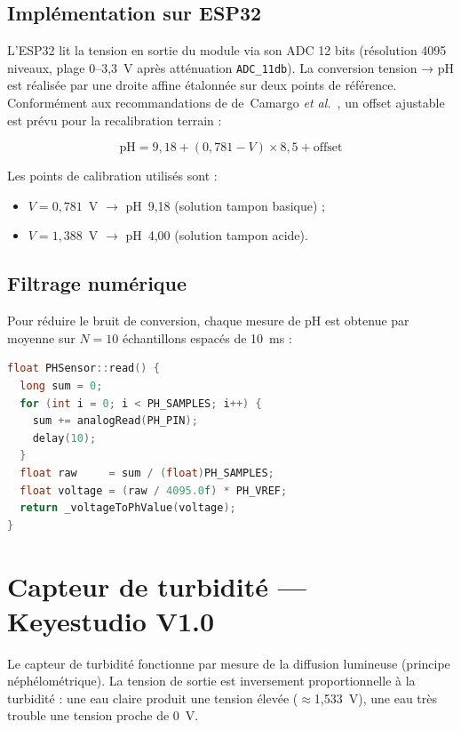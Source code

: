 \documentclass[12pt,a4paper]{report}
\newcommand{\code}[1]{\texttt{\small\colorbox{codebg}{#1}}}
\begin{document}
\subsection{Implémentation sur ESP32}

L'ESP32 lit la tension en sortie du module via son ADC 12 bits (résolution 4095 niveaux,
plage 0--3{,}3~V après atténuation \code{ADC\_11db}). La conversion tension → pH est réalisée
par une droite affine étalonnée sur deux points de référence. Conformément aux
recommandations de de~Camargo \textit{et al.}~\cite{camargo2023lowcost}, un offset
ajustable est prévu pour la recalibration terrain :

\begin{equation}
\text{pH} = 9{,}18 + (0{,}781 - V) \times 8{,}5 + \text{offset}
\label{eq:ph_conv}
\end{equation}

Les points de calibration utilisés sont :
\begin{itemize}
  \item $V = 0{,}781$~V $\rightarrow$ pH~9,18 (solution tampon basique) ;
  \item $V = 1{,}388$~V $\rightarrow$ pH~4,00 (solution tampon acide).
\end{itemize}

\subsection{Filtrage numérique}

Pour réduire le bruit de conversion, chaque mesure de pH est obtenue par moyenne sur
$N = 10$ échantillons espacés de 10~ms :

\begin{lstlisting}[language=C++,caption={Filtrage par moyennage -- ph\_sensor.cpp}]
float PHSensor::read() {
  long sum = 0;
  for (int i = 0; i < PH_SAMPLES; i++) {
    sum += analogRead(PH_PIN);
    delay(10);
  }
  float raw     = sum / (float)PH_SAMPLES;
  float voltage = (raw / 4095.0f) * PH_VREF;
  return _voltageToPhValue(voltage);
}
\end{lstlisting}

\section{Capteur de turbidité --- Keyestudio V1.0}

Le capteur de turbidité fonctionne par mesure de la diffusion lumineuse (principe
néphélométrique). La tension de sortie est inversement proportionnelle à la turbidité :
une eau claire produit une tension élevée ($\approx$1,533~V), une eau très trouble une tension
proche de 0~V.
\end{document}
